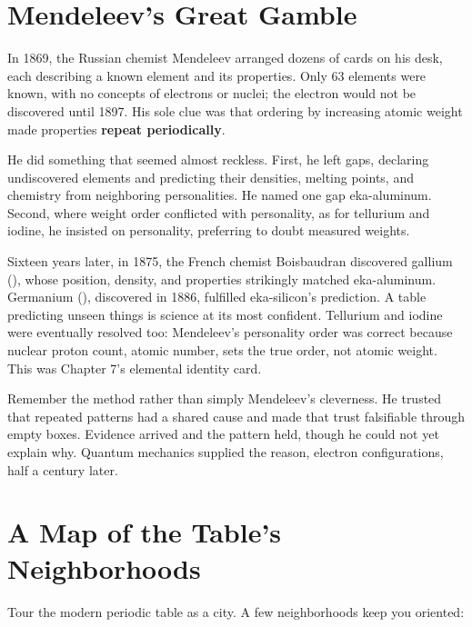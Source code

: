 \section{Mendeleev's Great Gamble}

\begin{zhengju}
In 1869, the Russian chemist Mendeleev arranged dozens of cards on his desk, each describing a known element and its properties. Only 63 elements were known, with no concepts of electrons or nuclei; the electron would not be discovered until 1897. His sole clue was that ordering by increasing atomic weight made properties \textbf{repeat periodically}.

He did something that seemed almost reckless. First, he left gaps, declaring undiscovered elements and predicting their densities, melting points, and chemistry from neighboring personalities. He named one gap eka-aluminum. Second, where weight order conflicted with personality, as for tellurium and iodine, he insisted on personality, preferring to doubt measured weights.

Sixteen years later, in 1875, the French chemist Boisbaudran discovered gallium (), whose position, density, and properties strikingly matched eka-aluminum. Germanium (), discovered in 1886, fulfilled eka-silicon's prediction. A table predicting unseen things is science at its most confident. Tellurium and iodine were eventually resolved too: Mendeleev's personality order was correct because nuclear proton count, atomic number, sets the true order, not atomic weight. This was Chapter 7's elemental identity card.

Remember the method rather than simply Mendeleev's cleverness. He trusted that repeated patterns had a shared cause and made that trust falsifiable through empty boxes. Evidence arrived and the pattern held, though he could not yet explain why. Quantum mechanics supplied the reason, electron configurations, half a century later.
\end{zhengju}

\section{A Map of the Table's Neighborhoods}

Tour the modern periodic table as a city. A few neighborhoods keep you oriented:

